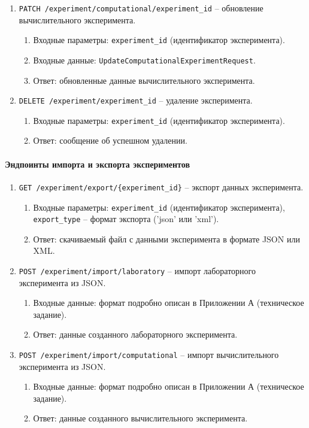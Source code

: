 \begin{enumerate}
\item \texttt{PATCH /experiment/computational/{experiment\_id}} -- обновление вычислительного эксперимента.
\begin{enumerate}[label=\arabic{enumi}.\arabic*.]
\item Входные параметры: \texttt{experiment\_id} (идентификатор эксперимента).
\item Входные данные: \texttt{UpdateComputationalExperimentRequest}.
\item Ответ: обновленные данные вычислительного эксперимента.
\end{enumerate}

\item \texttt{DELETE /experiment/{experiment\_id}} -- удаление эксперимента.
\begin{enumerate}[label=\arabic{enumi}.\arabic*.]
\item Входные параметры: \texttt{experiment\_id} (идентификатор эксперимента).
\item Ответ: сообщение об успешном удалении.
\end{enumerate}
\end{enumerate}

\paragraph{Эндпоинты импорта и экспорта экспериментов}

\begin{enumerate}
\item \texttt{GET /experiment/export/\{experiment\_id\}} -- экспорт данных эксперимента.
\begin{enumerate}[label=\arabic{enumi}.\arabic*.]
\item Входные параметры: \texttt{experiment\_id} (идентификатор эксперимента), \texttt{export\_type} – формат экспорта ('json' или 'xml').
\item Ответ: скачиваемый файл с данными эксперимента в формате JSON или XML.
\end{enumerate}
\item \texttt{POST /experiment/import/laboratory} -- импорт лабораторного эксперимента из JSON.
\begin{enumerate}[label=\arabic{enumi}.\arabic*.]
\item Входные данные: формат подробно описан в Приложении А (техническое задание).
\item Ответ: данные созданного лабораторного эксперимента.
\end{enumerate}
\item \texttt{POST /experiment/import/computational} -- импорт вычислительного эксперимента из JSON.
\begin{enumerate}[label=\arabic{enumi}.\arabic*.]
\item Входные данные: формат подробно описан в Приложении А (техническое задание).
\item Ответ: данные созданного вычислительного эксперимента.
\end{enumerate}
\end{enumerate}

